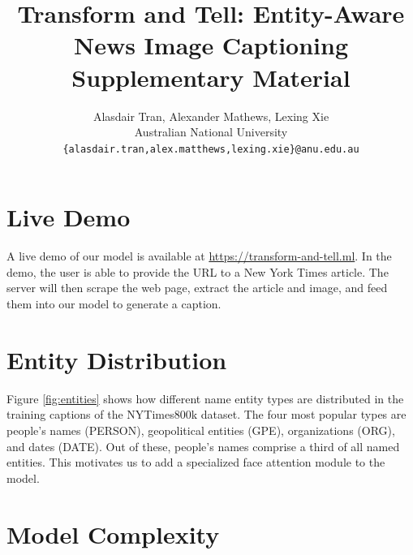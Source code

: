 \documentclass[10pt,twocolumn,letterpaper]{article}
\begin{document}
\title{Transform and Tell: Entity-Aware News Image Captioning\\Supplementary Material}

\author{Alasdair Tran, Alexander Mathews, Lexing Xie\\
Australian National University\\
{\tt\small \{alasdair.tran,alex.matthews,lexing.xie\}@anu.edu.au}
}

\maketitle

\section{Live Demo}

A live demo of our model is available at
\href{https://transform-and-tell.ml}{https://transform-and-tell.ml}. In the
demo, the user is able to provide the URL to a New York Times article. The
server will then scrape the web page, extract the article and image, and
feed them into our model to generate a caption.

\section{Entity Distribution}

Figure \ref{fig:entities} shows how different name entity types are distributed
in the training captions of the NYTimes800k dataset. The four most popular
types are people's names (PERSON), geopolitical entities (GPE), organizations
(ORG), and dates (DATE). Out of these, people's names comprise a third of all
named entities. This motivates us to add a specialized face attention module to
the model.

\section{Model Complexity}
\end{document}
